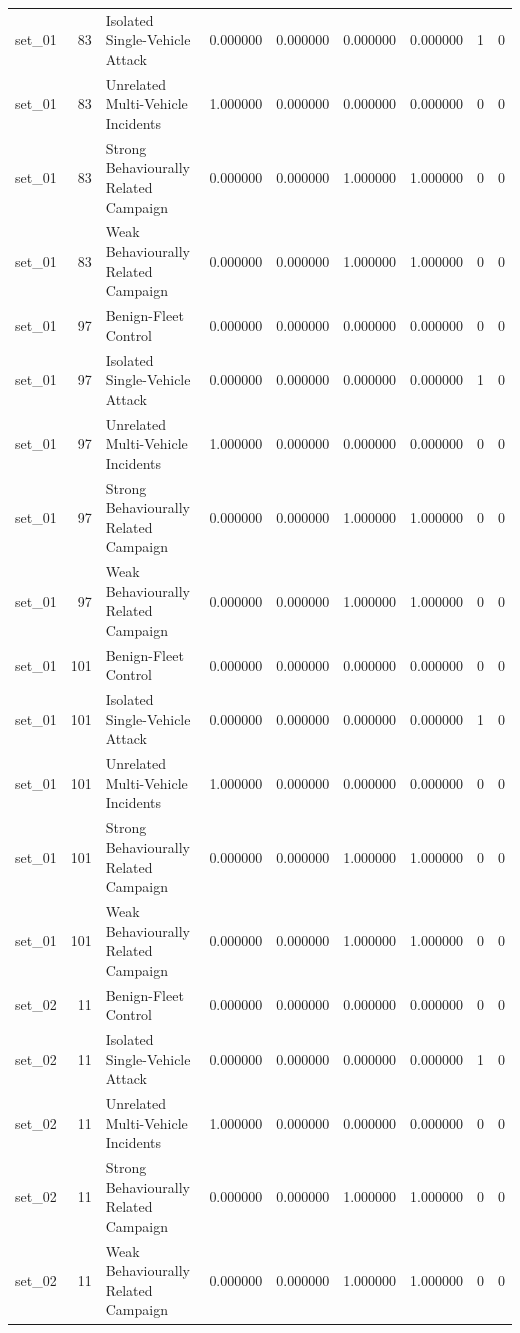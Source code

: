 \begin{tabular}{lrlrrrrrr}
set_01 & 83 & Isolated Single-Vehicle Attack & 0.000000 & 0.000000 & 0.000000 & 0.000000 & 1 & 0 \\
set_01 & 83 & Unrelated Multi-Vehicle Incidents & 1.000000 & 0.000000 & 0.000000 & 0.000000 & 0 & 0 \\
set_01 & 83 & Strong Behaviourally Related Campaign & 0.000000 & 0.000000 & 1.000000 & 1.000000 & 0 & 0 \\
set_01 & 83 & Weak Behaviourally Related Campaign & 0.000000 & 0.000000 & 1.000000 & 1.000000 & 0 & 0 \\
set_01 & 97 & Benign-Fleet Control & 0.000000 & 0.000000 & 0.000000 & 0.000000 & 0 & 0 \\
set_01 & 97 & Isolated Single-Vehicle Attack & 0.000000 & 0.000000 & 0.000000 & 0.000000 & 1 & 0 \\
set_01 & 97 & Unrelated Multi-Vehicle Incidents & 1.000000 & 0.000000 & 0.000000 & 0.000000 & 0 & 0 \\
set_01 & 97 & Strong Behaviourally Related Campaign & 0.000000 & 0.000000 & 1.000000 & 1.000000 & 0 & 0 \\
set_01 & 97 & Weak Behaviourally Related Campaign & 0.000000 & 0.000000 & 1.000000 & 1.000000 & 0 & 0 \\
set_01 & 101 & Benign-Fleet Control & 0.000000 & 0.000000 & 0.000000 & 0.000000 & 0 & 0 \\
set_01 & 101 & Isolated Single-Vehicle Attack & 0.000000 & 0.000000 & 0.000000 & 0.000000 & 1 & 0 \\
set_01 & 101 & Unrelated Multi-Vehicle Incidents & 1.000000 & 0.000000 & 0.000000 & 0.000000 & 0 & 0 \\
set_01 & 101 & Strong Behaviourally Related Campaign & 0.000000 & 0.000000 & 1.000000 & 1.000000 & 0 & 0 \\
set_01 & 101 & Weak Behaviourally Related Campaign & 0.000000 & 0.000000 & 1.000000 & 1.000000 & 0 & 0 \\
set_02 & 11 & Benign-Fleet Control & 0.000000 & 0.000000 & 0.000000 & 0.000000 & 0 & 0 \\
set_02 & 11 & Isolated Single-Vehicle Attack & 0.000000 & 0.000000 & 0.000000 & 0.000000 & 1 & 0 \\
set_02 & 11 & Unrelated Multi-Vehicle Incidents & 1.000000 & 0.000000 & 0.000000 & 0.000000 & 0 & 0 \\
set_02 & 11 & Strong Behaviourally Related Campaign & 0.000000 & 0.000000 & 1.000000 & 1.000000 & 0 & 0 \\
set_02 & 11 & Weak Behaviourally Related Campaign & 0.000000 & 0.000000 & 1.000000 & 1.000000 & 0 & 0 \\

\end{tabular}
